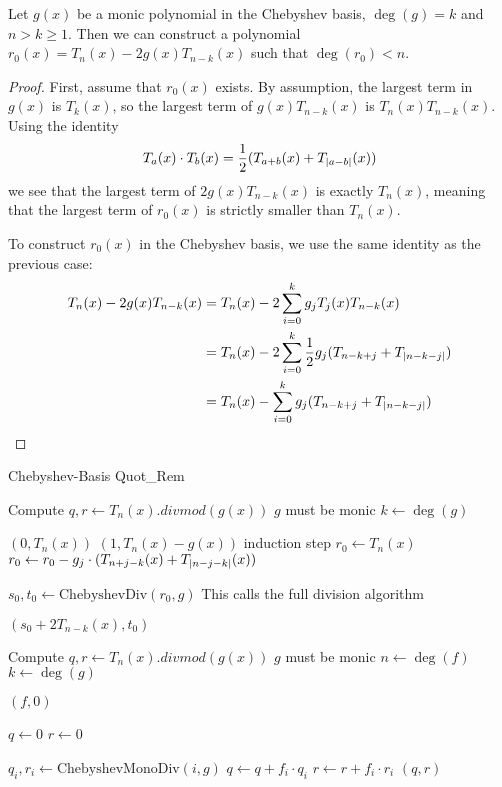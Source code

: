 \documentclass[../fheimpl.tex]{subfiles}
\begin{document}
\begin{lemma}
	\label{lem:r0lemma}
	Let $g(x)$ be a monic polynomial in the Chebyshev basis, $\deg(g)=k$ and $n>k\ge 1$. Then we can construct a polynomial $r_0(x) = T_n(x) - 2g(x)T_{n-k}(x)$ such that $\deg(r_0) < n$.
\end{lemma}
\begin{proof}
	First, assume that $r_0(x)$ exists. By assumption, the largest term in $g(x)$ is $T_k(x)$, so the largest term of $g(x)T_{n-k}(x)$ is $T_n(x)T_{n-k}(x)$. Using the identity\[T_a(x)\cdot T_b(x) = \frac{1}{2}(T_{a+b}(x)+T_{\lvert a-b\rvert}(x))\]
	we see that the largest term of $2g(x)T_{n-k}(x)$ is exactly $T_n(x)$, meaning that the largest term of $r_0(x)$ is strictly smaller than $T_n(x)$.
	
	To construct $r_0(x)$ in the Chebyshev basis, we use the same identity as the previous case:
	\begin{align}
		T_n(x)-2g(x)T_{n-k}(x) & = T_n(x)-2\sum_{i=0}^kg_jT_j(x)T_{n-k}(x) \\
		& = T_n(x)-2\sum_{i=0}^k\frac{1}{2}g_j(T_{n-k+j} + T_{\lvert n-k-j\rvert}) \\
		& = T_n(x)-\sum_{i=0}^kg_j(T_{n-k+j} + T_{\lvert n-k-j\rvert})
	\end{align}
\end{proof}

\begin{algorithm}
	\caption{Chebyshev-Basis Quot\_Rem}\label{alg:chebydiv}
	\begin{algorithmic}[1]
		\Comment Compute $q, r\gets T_n(x).divmod(g(x))$
		\State \Comment $g$ must be monic
		\State $k \gets \deg(g)$
		
		 
		\State \Return $(0, T_n(x))$
		 
		\State \Return $(1, T_n(x)-g(x))$
		\Else
		\Comment induction step
		\State $r_0 \gets T_n(x)$
		\State $r_0 \gets r_0 - g_j\cdot (T_{n+j-k}(x) + T_{\lvert n-j-k\rvert}(x))$
		\EndFor
		
		\State $s_0, t_0 \gets \text{ChebyshevDiv}(r_0, g)$
		\Comment This calls the full division algorithm
		
		\State \Return $(s_0 + 2T_{n-k}(x), t_0)$
		\EndIf
		\EndProcedure
		\State
		
		
		\Comment Compute $q, r\gets T_n(x).divmod(g(x))$
		\State \Comment $g$ must be monic
		\State $n \gets \deg(f)$
		\State $k \gets \deg(g)$
		
		 
		\State \Return $(f, 0)$
		\EndIf
		
		\State $q\gets 0$
		\State $r\gets 0$
		
		\State $q_i, r_i\gets \text{ChebyshevMonoDiv}(i, g)$
		\State $q \gets q + f_i\cdot q_i$
		\State $r \gets r + f_i\cdot r_i$
		\EndFor
		\State \Return $(q,r)$
		\EndProcedure
	\end{algorithmic}
\end{algorithm}
\end{document}
